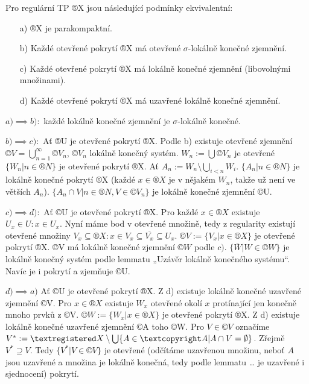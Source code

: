 \documentclass[12pt]{article}                   %
\begin{document}
    \begin{veta}
        Pro regulární TP ®X jsou následující podmínky ekvivalentní:
        
        \begin{itemize}
            \item[a)] ®X je parakompaktní.
            \item[b)] Každé otevřené pokrytí ®X má otevřené $\sigma$-lokálně konečné zjemnění.
            \item[c)] Každé otevřené pokrytí ®X má lokálně konečné zjemnění (libovolnými množinami).
            \item[d)] Každé otevřené pokrytí ®X má uzavřené lokálně konečné zjemnění. 
        \end{itemize}

        \begin{dukazin}
            $a) \implies b):$ každé lokálně konečné zjemnění je $\sigma$-lokálně konečné.

            $b) \implies c):$ Ať ®U je otevřené pokrytí ®X. Podle b) existuje otevřené zjemnění $©V = \bigcup_{n=1}^∞ ©V_n$, $©V_n$ lokálně konečný systém. $W_n:=\bigcup ©V_n$ je otevřené $\{W_n | n \in ®N\}$ je otevřené pokrytí ®X. Ať $A_n := W_n \setminus \bigcup_{i < n} W_i$. $\{A_n | n \in ®N\}$ je lokálně konečné pokrytí ®X (každé $x \in ®X$ je v nějakém $W_n$, takže už není ve větších $A_n$). $\{A_n \cap V | n \in ®N, V \in ©V_n\}$ je lokálně konečné zjemnění ©U.


            $c) \implies d):$ Ať ©U je otevřené pokrytí ®X. Pro každé $x \in ®X$ existuje $U_x \in U: x \in U_x$. Nyní máme bod v otevřené množině, tedy z regularity existují otevřené množiny $V_x \subseteq ®X: x \in V_x \subseteq \overline{V_x} \subseteq U_x$. $©V:=\{V_x | x \in ®X\}$ je otevřené pokrytí ®X. ©V má lokálně konečné zjemnění $©W$ podle $c)$. $\{\overline{W} | W \in ©W\}$ je lokálně konečný systém podle lemmatu „Uzávěr lokálně konečného systému“. Navíc je i pokrytí a zjemňuje ©U.

            $d) \implies a)$ Ať ©U je otevřené pokrytí ®X. Z d) existuje lokálně konečné uzavřené zjemnění ©V. Pro $x \in ®X$ existuje $W_x$ otevřené okolí $x$ protínající jen konečně mnoho prvků z ©V. $©W:=\{W_x | x \in ®X\}$ je otevřené pokrytí ®X. Z d) existuje lokálně konečné uzavřené zjemnění ©A toho ©W. Pro $V \in ©V$ označíme $V^*:=®X \setminus \bigcup\{A \in ©A | A \cap V = \O\}$. Zřejmě $V^* \supseteq V$. Tedy $\{V^* | V \in ©V\}$ je otevřené (odčítáme uzavřenou množinu, neboť $A$ jsou uzavřené a množina je lokálně konečná, tedy podle lemmatu … je uzavřené i sjednocení) pokrytí.


\end{dukazin}
\end{veta}
\end{document}

